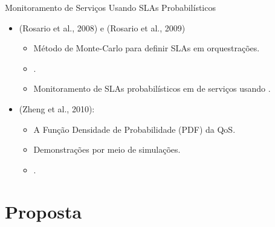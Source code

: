 \documentclass[xcolor=svgnames]{beamer}
\begin{document}
  \begin{frame}{ Monitoramento de Serviços Usando SLAs Probabilísticos}
      \begin{itemize}
	\item <1-> (Rosario et al., 2008) e (Rosario et al., 2009)
	    \begin{itemize}
	      \item Método de Monte-Carlo para definir SLAs em orquestrações.
	      \item \color{red}{Foco no tempo de resposta}.
	      \item Monitoramento de SLAs probabilísticos em \color{red}{orquestrações} de serviços usando \color{red}{Orc}.
	    \end{itemize}
	
	\item <2-> (Zheng et al., 2010):
	    \begin{itemize}
	      \item A Função Densidade de Probabilidade (PDF) da QoS. %
	      \item Demonstrações por meio de simulações.
	      \item \color{red}{Foco no tempo de resposta e não trata SLAs}.
	    \end{itemize}
      \end{itemize}

   \end{frame}





\section{Proposta}
\end{document}
